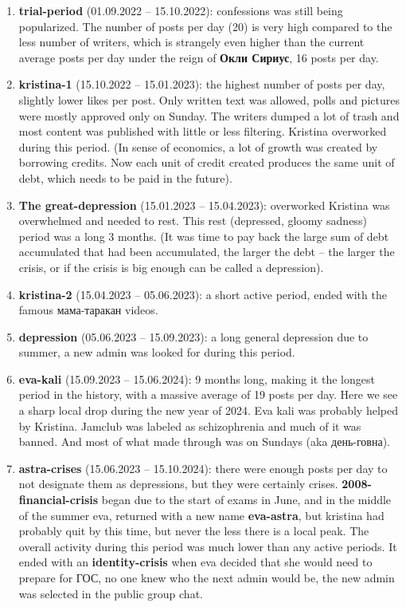 \documentclass[
	12pt
] {article}
\begin{document}
	\begin{enumerate}
		\item \textbf{trial-period} (01.09.2022 -- 15.10.2022): confessions was still being popularized. The number of posts per day (\num{20}) is very high compared to the less number of writers, which is strangely even higher than the current average posts per day under the reign of \textbf{Окли Сириус}, \num{16} posts per day.
	
		\item \textbf{kristina-1} (15.10.2022 -- 15.01.2023): the highest number of posts per day, slightly lower likes per post. Only written text was allowed, polls and pictures were mostly approved only on Sunday. The writers dumped a lot of trash and most content was published with little or less filtering. Kristina overworked during this period. (In sense of economics, a lot of growth was created by borrowing credits. Now each unit of credit created produces the same unit of debt, which needs to be paid in the future).
	
		\item \textbf{The great-depression} (15.01.2023 -- 15.04.2023): overworked Kristina was overwhelmed and needed to rest. This rest (depressed, gloomy sadness) period was a long 3 months. (It was time to pay back the large sum of debt accumulated that had been accumulated, the larger the debt -- the larger the crisis, or if the crisis is big enough can be called a depression).
		
		\item \textbf{kristina-2} (15.04.2023 -- 05.06.2023): a short active period, ended with the famous мама-таракан videos.
		
		\item \textbf{depression} (05.06.2023 -- 15.09.2023): a long general depression due to summer, a new admin was looked for during this period.
		
		\item \textbf{eva-kali} (15.09.2023 -- 15.06.2024): 9 months long, making it the longest period in the history, with a massive average of 19 posts per day. Here we see a sharp local drop during the new year of 2024. Eva kali was probably helped by Kristina. Jamclub was labeled as schizophrenia and much of it was banned. And most of what made through was on Sundays (aka день-говна).
		
		\item \textbf{astra-crises} (15.06.2023 -- 15.10.2024): there were enough posts per day to not designate them as depressions, but they were certainly crises. \textbf{2008-financial-crisis} began due to the start of exams in June, and in the middle of the summer eva, returned with a new name \textbf{eva-astra}, but kristina had probably quit by this time, but never the less there is a local peak. The overall activity during this period was much lower than any active periods. It ended with an \textbf{identity-crisis} when eva decided that she would need to prepare for ГОС, no one knew who the next admin would be, the new admin was selected in the public group chat.
		

\end{enumerate}
\end{document}
